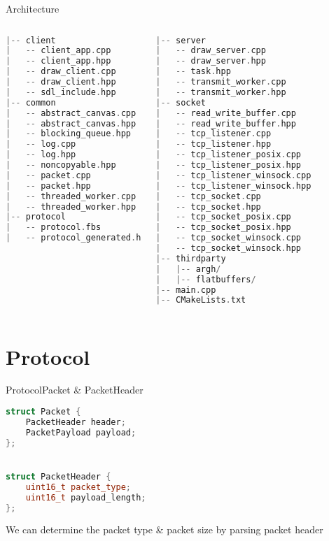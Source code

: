 \documentclass{beamer}
\begin{document}
\begin{frame}[fragile]{Architecture}
\begin{columns}[c] %

\begin{lstlisting}[language=c++,numbers=none,basicstyle=\ttfamily\tiny]
|-- client
|   -- client_app.cpp
|   -- client_app.hpp
|   -- draw_client.cpp
|   -- draw_client.hpp
|   -- sdl_include.hpp
|-- common
|   -- abstract_canvas.cpp
|   -- abstract_canvas.hpp
|   -- blocking_queue.hpp
|   -- log.cpp
|   -- log.hpp
|   -- noncopyable.hpp
|   -- packet.cpp
|   -- packet.hpp
|   -- threaded_worker.cpp
|   -- threaded_worker.hpp
|-- protocol
|   -- protocol.fbs
|   -- protocol_generated.h
\end{lstlisting}

\begin{lstlisting}[language=c++,numbers=none,basicstyle=\ttfamily\tiny]
|-- server
|   -- draw_server.cpp
|   -- draw_server.hpp
|   -- task.hpp
|   -- transmit_worker.cpp
|   -- transmit_worker.hpp
|-- socket
|   -- read_write_buffer.cpp
|   -- read_write_buffer.hpp
|   -- tcp_listener.cpp
|   -- tcp_listener.hpp
|   -- tcp_listener_posix.cpp
|   -- tcp_listener_posix.hpp
|   -- tcp_listener_winsock.cpp
|   -- tcp_listener_winsock.hpp
|   -- tcp_socket.cpp
|   -- tcp_socket.hpp
|   -- tcp_socket_posix.cpp
|   -- tcp_socket_posix.hpp
|   -- tcp_socket_winsock.cpp
|   -- tcp_socket_winsock.hpp
|-- thirdparty
|   |-- argh/
|   |-- flatbuffers/
|-- main.cpp
|-- CMakeLists.txt
\end{lstlisting}

\end{columns}
\end{frame}


\section{Protocol}

\begin{frame}[fragile]{Protocol}{Packet \& PacketHeader}
\begin{lstlisting}[language=c++]
struct Packet {
    PacketHeader header;
    PacketPayload payload;
};


struct PacketHeader {
    uint16_t packet_type;
    uint16_t payload_length;
};
\end{lstlisting}

We can determine the packet type \& packet size by parsing packet header
\end{frame}
\end{document}
